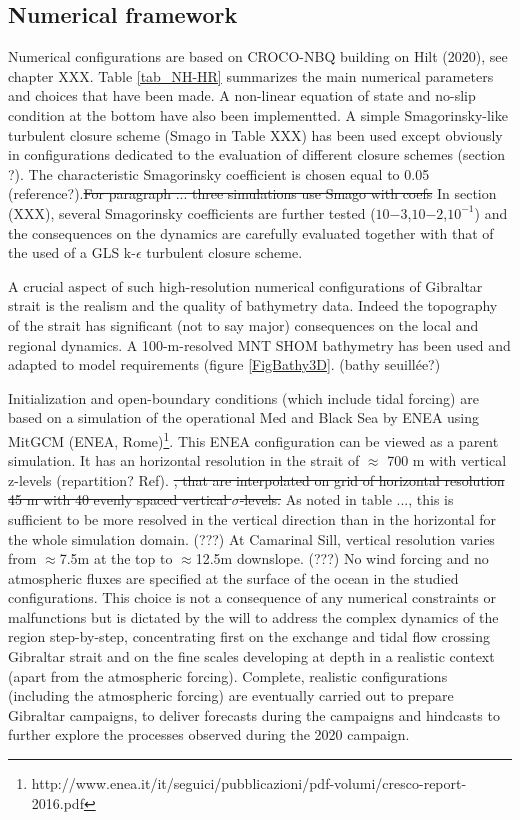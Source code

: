 \subsection{Numerical framework}

\color{blue}Numerical configurations are based on \color{black} CROCO-NBQ building on Hilt (2020), see chapter XXX. \color{black} Table \ref{tab_NH-HR} summarizes \color{blue} the main numerical parameters and choices that have been made. A non-linear equation of state and no-slip condition at the bottom have also been implementted. \color{blue} A simple Smagorinsky-like turbulent closure scheme (Smago in Table XXX) has been used except obviously in configurations dedicated to the evaluation of different closure schemes (section ?). The characteristic Smagorinsky coefficient is chosen equal to 0.05 (reference?).\sout{For paragraph ... three simulations use Smago with coefs} In section (XXX), several Smagorinsky coefficients are further tested  ($10{-3}$,$10{-2}$,$10^{-1}$) and the consequences on the dynamics are carefully evaluated together with that of the used of a GLS k-$\epsilon$ turbulent closure scheme. \color{black}

\color{blue}A crucial aspect of such high-resolution numerical configurations of Gibraltar strait is the realism and the quality of bathymetry data. Indeed the topography of the strait has significant (not to say major) consequences on the local and regional dynamics. A 100-m-resolved MNT SHOM bathymetry has been used and adapted to model requirements (figure \ref{FigBathy3D}. (bathy seuillée?) \color{black}

Initialization and open-boundary conditions (which include tidal forcing) are based on a simulation of the operational Med and Black Sea by ENEA using MitGCM (ENEA, Rome)\footnote{http://www.enea.it/it/seguici/pubblicazioni/pdf-volumi/cresco-report-2016.pdf}. This ENEA configuration can be viewed as a parent simulation. \color{black} It has an horizontal resolution in the strait of $\approx$ 700 m with vertical z-levels (repartition? Ref). \sout{, that are interpolated on grid of horizontal resolution 45 m with 40 evenly spaced vertical $\sigma$-levels.} \color{black} As noted in table ..., this is sufficient to be more resolved in the vertical direction than in the horizontal for the whole simulation domain. \color{blue}(???) \color{black} At Camarinal Sill, vertical resolution varies from $\approx$7.5m at the top to $\approx$12.5m downslope. \color{blue}(???) No wind forcing and no atmospheric fluxes are specified at the surface of the ocean in the studied configurations. This choice is not a consequence of any numerical constraints or malfunctions but is dictated by the will to address the complex dynamics of the region step-by-step, concentrating first on the exchange and tidal flow crossing Gibraltar strait and on the fine scales developing at depth in a realistic context (apart from the atmospheric forcing). Complete, realistic configurations (including the atmospheric forcing) are eventually carried out to prepare Gibraltar campaigns, to deliver forecasts during the campaigns and hindcasts to further explore the processes observed during the 2020 campaign.\color{black}


